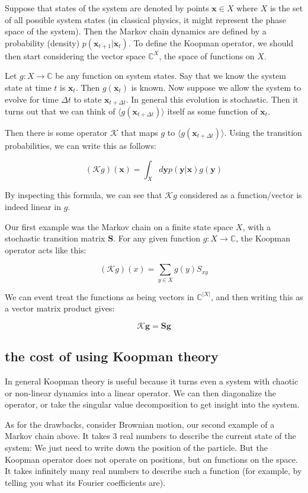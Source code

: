 \documentclass[]{article}
\newcommand{\w}[1]{\mathbf{#1}}
\newcommand{\CC}{\mathbb{C}}
\newcommand{\Kp}{\mathcal{K}}
\begin{document}
Suppose that states of the system are denoted by points $\w{x}\in X$ where $X$ is the set of all possible system states (in classical physics, it might represent the phase space of the system). Then the Markov chain dynamics are defined by a probability (density) $p(\w{x}_{t+1}|\w{x}_{t})$. To define the Koopman operator, we should then start considering the vector space $\CC^X$, the space of functions on $X$.

Let $g:X\to\CC$ be any function on system states. Say that we know the system state at time $t$ is $\w{x}_t$. Then $g(\w{x}_t)$ is known. Now suppose we allow the system to evolve for time $\Delta t$ to state $\w{x}_{t+\Delta t}$. In general this evolution is stochastic. Then it turns out that we can think of $\langle g(\w{x}_{t+\Delta t})\rangle$ itself as some function of $\w{x}_t$.

Then there is some operator $\Kp$ that maps $g$ to $\langle g(\w{x}_{t+\Delta t})\rangle$. Using the transition probabilities, we can write this as follows:

$$
(\Kp g)(\w{x}) = \int_X d\w{y} p(\w{y}|\w{x}) g(\w{y})
$$

By inspecting this formula, we can see that $\Kp g$ considered as a function/vector is indeed linear in $g$.

Our first example was the Markov chain on a finite state space $X$, with a stochastic transition matrix $\w{S}$. For any given function $g:X \to \CC$, the Koopman operator acts like this:

$$
(\Kp g)(x) = \sum_{y\in X} g(y) S_{xy}
$$

We can event treat the functions as being vectors in $\CC^{|X|}$, and then writing this as a vector matrix product gives:

$$
\Kp \w{g} = \w{S}\w{g}
$$


\subsection{the cost of using Koopman theory}

In general Koopman theory is useful because it turns even a system with chaotic or non-linear dynamics into a linear operator. We can then diagonalize the operator, or take the singular value decomposition to get insight into the system.

As for the drawbacks, consider Brownian motion, our second example of a Markov chain above. It takes 3 real numbers to describe the current state of the system: We just need to write down the position of the particle. But the Koopman operator does not operate on positions, but on functions on the space. It takes infinitely many real numbers to describe such a function (for example, by telling you what its Fourier coefficients are).
\end{document}
